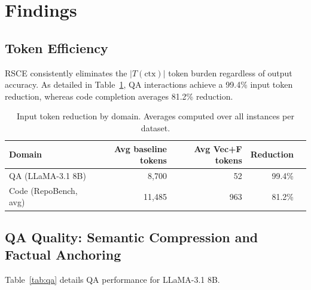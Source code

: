 \documentclass[11pt]{article}
\newcommand{\ctx}{\mathrm{ctx}}
\begin{document}
\section{Findings}
\label{sec:results}

\subsection{Token Efficiency}
RSCE consistently eliminates the $|T(\ctx)|$ token burden regardless of output accuracy. As detailed in Table~\ref{tab:efficiency}, QA interactions achieve a 99.4\% input token reduction, whereas code completion averages 81.2\% reduction.

\begin{table}[h]
\centering
\caption{Input token reduction by domain. Averages computed over all instances per dataset.}
\label{tab:efficiency}
\begin{tabular}{lrrrr}
\toprule
Domain & Avg baseline tokens & Avg Vec+F tokens & Reduction \\
\midrule
QA (LLaMA-3.1 8B)       & 8,700  & 52  & 99.4\% \\
Code (RepoBench, avg)    & 11,485 & 963 & 81.2\% \\
\bottomrule
\end{tabular}
\end{table}

\subsection{QA Quality: Semantic Compression and Factual Anchoring}
\label{sec:qa_results}
Table~\ref{tab:qa} details QA performance for LLaMA-3.1 8B.
\end{document}
